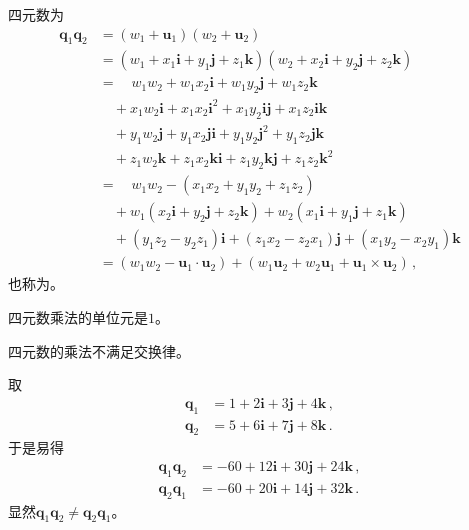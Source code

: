 \begin{definition}
    四元数为
    \begin{align}
        {\bm q}_1{\bm q}_2 & =(w_1+{\bm u}_1)(w_2+{\bm u}_2)\nonumber                                                                      \\
                           & =(w_1+x_1\mathbf{i}+y_1\mathbf{j}+z_1\mathbf{k})(w_2+x_2\mathbf{i}+y_2\mathbf{j}+z_2\mathbf{k})\nonumber      \\
                           & =\quad w_1w_2+w_1x_2\mathbf{i}+w_1y_2\mathbf{j}+w_1z_2\mathbf{k}\nonumber                                     \\
                           & \quad +x_1w_2\mathbf{i}+x_1x_2\mathbf{i}^2+x_1y_2\mathbf{i}\mathbf{j}+x_1z_2\mathbf{i}\mathbf{k}\nonumber     \\
                           & \quad +y_1w_2\mathbf{j}+y_1x_2\mathbf{j}\mathbf{i}+y_1y_2\mathbf{j}^2+y_1z_2\mathbf{j}\mathbf{k}\nonumber     \\
                           & \quad +z_1w_2\mathbf{k}+z_1x_2\mathbf{k}\mathbf{i}+z_1y_2\mathbf{k}\mathbf{j}+z_1z_2\mathbf{k}^2\nonumber     \\
                           & =\quad w_1w_2-(x_1x_2+y_1y_2+z_1z_2)\nonumber                                                                 \\
                           & \quad +w_1(x_2\mathbf{i}+y_2\mathbf{j}+z_2\mathbf{k})+w_2(x_1\mathbf{i}+y_1\mathbf{j}+z_1\mathbf{k})\nonumber \\
                           & \quad +(y_1z_2-y_2z_1)\mathbf{i}+(z_1x_2-z_2x_1)\mathbf{j}+(x_1y_2-x_2y_1)\mathbf{k}\nonumber                 \\
                           & =(w_1w_2-{\bm u}_1\cdot{\bm u}_2)+(w_1{\bm u}_2+w_2{\bm u}_1+{\bm u}_1\times{\bm u}_2)\, ,
    \end{align}
    也称为。
\end{definition}
\begin{proposition}
    四元数乘法的单位元是$1$。
\end{proposition}
\begin{corollary}
    四元数的乘法不满足交换律。
\end{corollary}
\begin{example}
    取
    \begin{align}
        {\bm q}_1 & =1+2\mathbf{i}+3\mathbf{j}+4\mathbf{k}\, , \\
        {\bm q}_2 & =5+6\mathbf{i}+7\mathbf{j}+8\mathbf{k}\, .
    \end{align}
    于是易得
    \begin{align}
        {\bm q}_1{\bm q}_2 & =-60+12\mathbf{i}+30\mathbf{j}+24\mathbf{k}\, , \\
        {\bm q}_2{\bm q}_1 & =-60+20\mathbf{i}+14\mathbf{j}+32\mathbf{k}\, .
    \end{align}
    显然${\bm q}_1{\bm q}_2\neq{\bm q}_2{\bm q}_1$。
\end{example}
